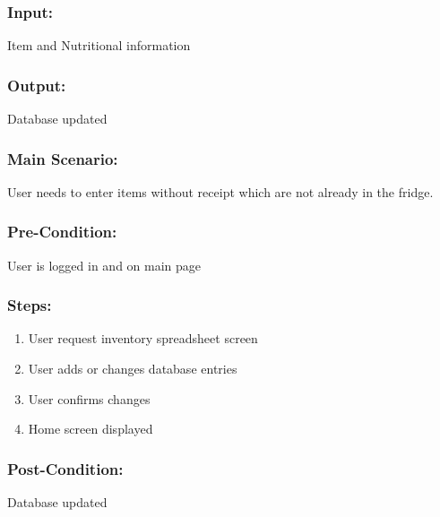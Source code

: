 		\subsubsection{Input:} Item and Nutritional information
		\subsubsection{Output:} Database updated
		\subsubsection{Main Scenario:} User needs to enter items without receipt which are not already in the fridge. 
		\subsubsection{Pre-Condition:} User is logged in and on main page
		\subsubsection{Steps:} 
		\begin{enumerate}
			\item User request inventory spreadsheet screen
			\item User adds or changes database entries
			\item User confirms changes
			\item Home screen displayed
		\end{enumerate}
		\subsubsection{Post-Condition:} Database updated
